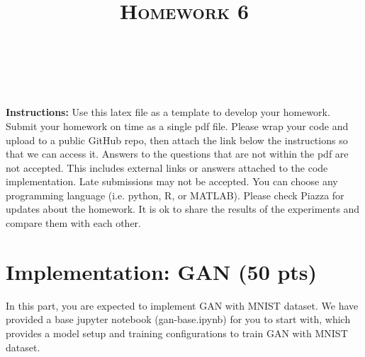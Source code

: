 \documentclass[a4paper]{article}
\title{\textsc{Homework 6}} %
\author{
	\red{Lucas Poon} \\
	\red{llpoon}\\
}
\date{}
\theoremstyle{definition}
\begin{document}
	
	\maketitle 
	
        \textbf{Instructions:}
        Use this latex file as a template to develop your homework. Submit your homework on time as a single pdf file. Please wrap your code and upload to a public GitHub repo, then attach the link below the instructions so that we can access it. Answers to the questions that are not within the pdf are not accepted. This includes external links or answers attached to the code implementation. Late submissions may not be accepted. You can choose any programming language (i.e. python, R, or MATLAB). Please check Piazza for updates about the homework. It is ok to share the results of the experiments and compare them with each other.
        \vspace{0.1in}
	
	\section{Implementation: GAN (50 pts)}
	In this part, you are expected to implement GAN with MNIST dataset. We have provided a base jupyter notebook (gan-base.ipynb) for you to start with, which provides a model setup and training configurations to train GAN with MNIST dataset.
	
\end{document}
